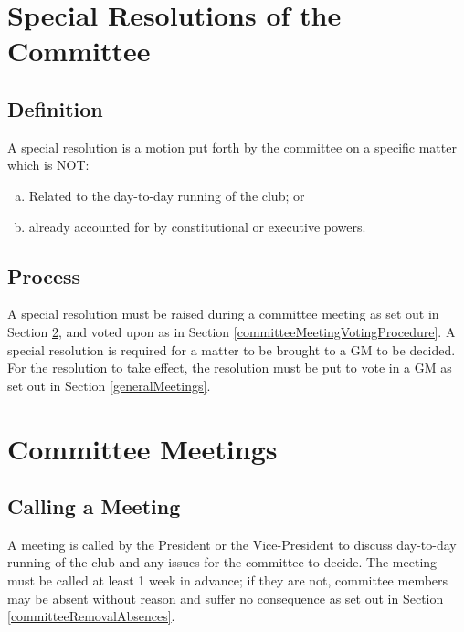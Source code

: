 \documentclass[11pt]{article}
\begin{document}
\section{Special Resolutions of the Committee} \label{specialResolutionsCommittee}

\subsection{Definition}
A special resolution is a motion put forth by the committee on a specific matter which is NOT:
\begin{enumerate}[(a)]
    \item Related to the day-to-day running of the club; or
    \item already accounted for by constitutional or executive powers.
\end{enumerate}

\subsection{Process}
A special resolution must be raised during a committee meeting as set out in Section \ref{committeeMeetings}, and voted upon as in Section \ref{committeeMeetingVotingProcedure}. A special resolution is required for a matter to be brought to a GM to be decided.
For the resolution to take effect, the resolution must be put to vote in a GM as set out in Section \ref{generalMeetings}.

\section{Committee Meetings} \label{committeeMeetings}

\subsection{Calling a Meeting}
A meeting is called by the President or the Vice-President to discuss day-to-day running of the club and any issues for the committee to decide. The meeting must be called at least 1 week in advance; if they are not, committee members may be absent without reason and suffer no consequence as set out in Section \ref{committeeRemovalAbsences}. 
\end{document}
